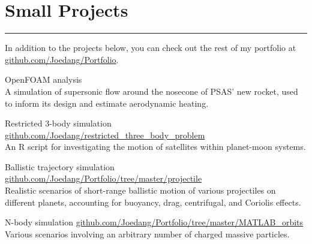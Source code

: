 \section{Small Projects}
\noindent\rule{\textwidth}{\hlinewidth}
In addition to the projects below, you can check out the rest of my portfolio at \url{github.com/Joedang/Portfolio}.
	\begin{innerlist}
	\item OpenFOAM analysis\\
	A simulation of supersonic flow around the nosecone of PSAS' new rocket, used to inform its design and estimate aerodynamic heating.
	\item Restricted 3-body simulation \hfill\url{github.com/Joedang/restricted\_three\_body\_problem}\\
	An R script for investigating the motion of satellites within planet-moon systems. 
	\item Ballistic trajectory simulation \hfill\url{github.com/Joedang/Portfolio/tree/master/projectile}\\
	Realistic scenarios of short-range ballistic motion of various projectiles on different planets, accounting for buoyancy, drag, centrifugal, and Coriolis effects.
	\item N-body simulation \hfill\url{github.com/Joedang/Portfolio/tree/master/MATLAB\_orbits}\\
	Various scenarios involving an arbitrary number of charged massive particles.
	\end{innerlist}

